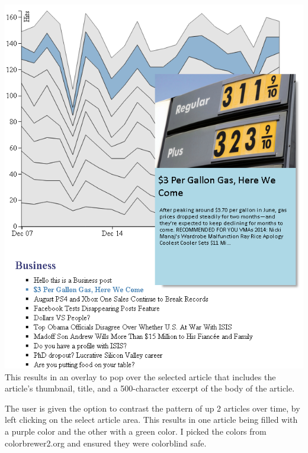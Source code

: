 \documentclass[12pt]{article}
\begin{document}
{\noindent\includegraphics[scale=0.7]{img/viz_2} \\

This results in an overlay to pop over the selected article that includes the article's thumbnail, title, and a 500-character excerpt of the body of the article. 

The user is given the option to contrast the pattern of up 2 articles over time, by left clicking on the select article area. This results in one article being filled with a purple color and the other with a green color. I picked the colors from colorbrewer2.org and ensured they were colorblind safe.

}
\end{document}
